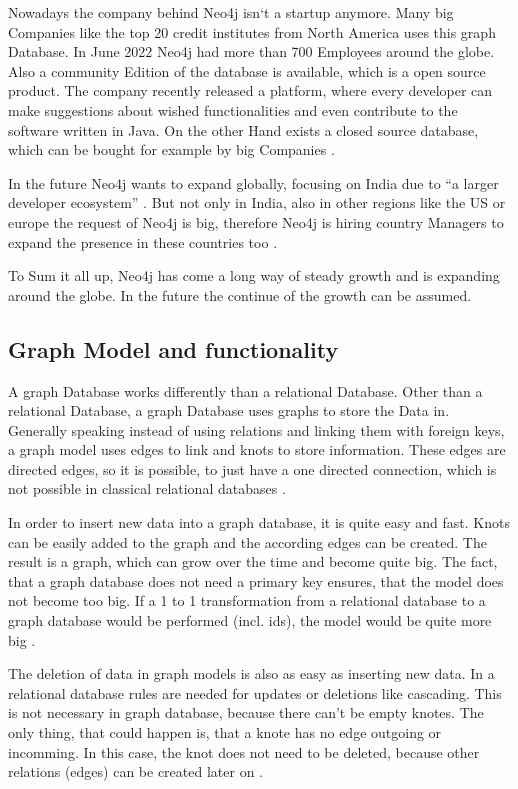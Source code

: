 Nowadays the company behind Neo4j isn`t a startup anymore. Many big Companies like the top 20 credit institutes from North America uses this graph Database.  In June 2022 Neo4j had more than 700 Employees around the globe.
Also a community Edition of the database is available, which is a open source product. The company recently released a platform, where every developer can make suggestions about wished functionalities and even contribute
to the software written in Java. On the other Hand exists a closed source database, which can be bought for example by big Companies \parencite{historyneo4j}.

In the future Neo4j wants to expand globally, focusing on India due to \enquote{a larger developer ecosystem} \parencite{historyneo4j}. But not only in India, also in other regions like the US or europe the request 
of Neo4j is big, therefore Neo4j is hiring country Managers to expand the presence in these countries too \parencite{historyneo4j}.

To Sum it all up, Neo4j has come a long way of steady growth and is expanding around the globe. In the future the continue of the growth can be assumed.

\subsection{Graph Model and functionality} \label{subsec:graphModelFunctionalityNeo4j}

A graph Database works differently than a relational Database. Other than a relational Database, a graph Database uses graphs to store the Data in. Generally speaking instead of using relations and linking them with foreign keys, a graph model uses edges to link and knots to store information.
These edges are directed edges, so it is possible, to just have a one directed connection, which is not possible in classical relational databases \parencite{graphmodelneo4j}.

In order to insert new data into a graph database, it is quite easy and fast. Knots can be easily added to the graph and the according edges can be created. The result is a graph, which can grow over the time and become quite big. The fact, that a graph database does not need a primary key ensures, that the model does not become too big. 
If a 1 to 1 transformation from a relational database to a graph database would be performed (incl. ids), the model would be quite more big \parencite{graphmodelneo4j}.

The deletion of data in graph models is also as easy as inserting new data. In a relational database rules are needed for updates or deletions like cascading. This is not necessary in graph database, because there can't be empty knotes. The only thing, that could happen is, that a knote has no edge outgoing or incomming. In this case, the knot
does not need to be deleted, because other relations (edges) can be created later on \parencite{graphmodelneo4j}.

